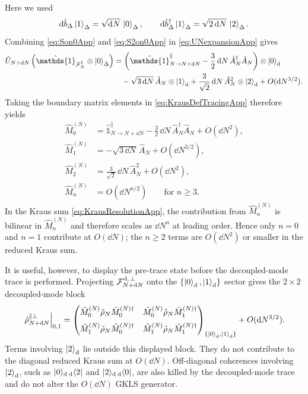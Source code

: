 \documentclass{article}
\def\cF{{\cal F}}
\newcommand{\openone}{\hat{\mathds{1}}}
\numberwithin{equation}{section}
\begin{document}
	Here we used
	\begin{equation}
		\dd\hat b_\Delta\ket{1}_\Delta = \sqrt{\dd N}\,\ket{0}_\Delta, \qquad \dd\hat b_\Delta^\dagger\ket{1}_\Delta = \sqrt{2\,\dd N}\,\ket{2}_\Delta .
	\end{equation}
	Combining \cref{eq:Son0App} and \cref{eq:S2on0App} in \cref{eq:UNexpansionApp} gives
	\begin{align}
		\hat U_{N+\dd N} \left( \openone_{\cF_N^\parallel}\otimes\ket{0}_\Delta \right) &= \left( \openone^\parallel_{N\to N+\dd N} - \frac32\,\dd N\,\hat A_N^\dagger\hat A_N \right) \otimes\ket{0}_{\rm d} \nonumber\\ &\quad - \sqrt{3\,\dd N}\, \hat A_N\otimes\ket{1}_{\rm d} + \frac{3}{\sqrt2}\,\dd N\, \hat A_N^2\otimes\ket{2}_{\rm d} + O(\dd N^{3/2}).
		\label{eq:Uon0App}
	\end{align}
	Taking the boundary matrix elements in \cref{eq:KrausDefTracingApp} therefore yields
	\begin{align}
		\hat M_0^{(N)} &= \openone^\parallel_{N\to N+\dd N} - \frac32\,\dd N\,\hat A_N^\dagger\hat A_N + O(\dd N^2),
		\label{eq:KrausVacuumApp}
		\\[4pt] \hat M_1^{(N)} &= -\sqrt{3\,\dd N}\,\hat A_N + O(\dd N^{3/2}),
		\label{eq:KrausOneParticleApp}
		\\[4pt] \hat M_2^{(N)} &= \frac{3}{\sqrt2}\,\dd N\,\hat A_N^2 + O(\dd N^2),
		\label{eq:KrausTwoParticleApp}
		\\[4pt] \hat M_n^{(N)} &= O(\dd N^{n/2}) \qquad\text{for }n\ge 3.
		\label{eq:KrausHigherApp}
	\end{align}
	In the Kraus sum \cref{eq:KrausResolutionApp}, the contribution from \(\hat M_n^{(N)}\) is bilinear in \(\hat M_n^{(N)}\) and therefore scales as \(\dd N^n\) at leading order. Hence only \(n=0\) and \(n=1\) contribute at \(O(\dd N)\); the \(n\ge2\) terms are \(O(\dd N^2)\) or smaller in the reduced Kraus sum.

	It is useful, however, to display the pre-trace state before the decoupled-mode trace is performed. Projecting \(\cF^{\rm d,\,\perp}_{N+\dd N}\) onto the \(\{\ket{0}_{\rm d},\ket{1}_{\rm d}\}\) sector gives the \(2\times2\) decoupled-mode block
	\begin{equation}
		\left. \hat\rho_{N+\dd N}^{\parallel\perp} \right|_{0,1} =
		\begin{pmatrix}
			\hat M_0^{(N)}\tilde{\rho}_N\hat M_0^{(N)\dagger} & \hat M_0^{(N)}\tilde{\rho}_N\hat M_1^{(N)\dagger} \\[6pt] \hat M_1^{(N)}\tilde{\rho}_N\hat M_0^{(N)\dagger} & \hat M_1^{(N)}\tilde{\rho}_N\hat M_1^{(N)\dagger}
		\end{pmatrix}_{\{\ket{0}_{\rm d},\ket{1}_{\rm d}\}}
		+ O(\dd N^{3/2}) .
		\label{eq:FullStateBlock01App}
	\end{equation}
	Terms involving \(\ket{2}_{\rm d}\) lie outside this displayed block. They do not contribute to the diagonal reduced Kraus sum at \(O(\dd N)\). Off-diagonal coherences involving \(\ket{2}_{\rm d}\), such as \(\ket{0}\!{}_{\rm d}\,{}_{\rm d}\!\bra{2}\) and \(\ket{2}\!{}_{\rm d}\,{}_{\rm d}\!\bra{0}\), are also killed by the decoupled-mode trace and do not alter the \(O(\dd N)\) GKLS generator.
\end{document}
